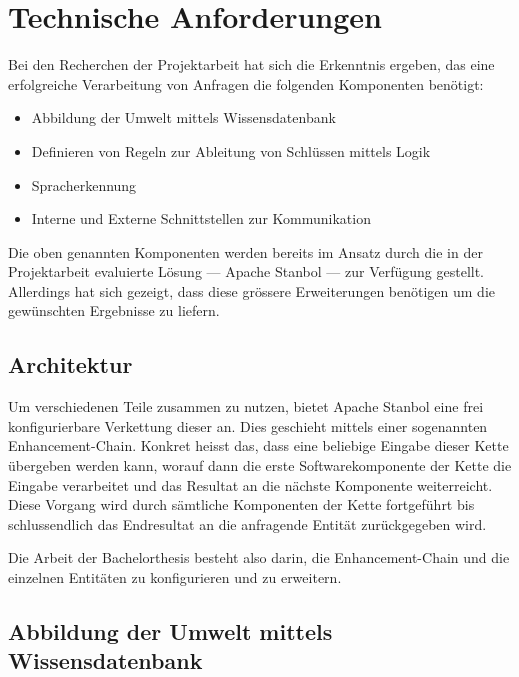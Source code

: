 \chapter{Technische Anforderungen}
\label{chap:technischeAnforderungen}

Bei den Recherchen der Projektarbeit hat sich die Erkenntnis ergeben, das eine erfolgreiche Verarbeitung von Anfragen die folgenden Komponenten benötigt:
\begin{itemize}
	\item Abbildung der Umwelt mittels Wissensdatenbank
	\item Definieren von Regeln zur Ableitung von Schlüssen mittels Logik
	\item Spracherkennung 
	\item Interne und Externe Schnittstellen zur Kommunikation
\end{itemize}

Die oben genannten Komponenten werden bereits im Ansatz durch die in der Projektarbeit evaluierte Lösung --- Apache Stanbol --- zur Verfügung gestellt. Allerdings hat sich gezeigt, dass diese grössere Erweiterungen benötigen um die gewünschten Ergebnisse zu liefern.

\section{Architektur}
\label{sec:architektur}
Um verschiedenen Teile zusammen zu nutzen, bietet Apache Stanbol eine frei konfigurierbare Verkettung dieser an. Dies geschieht mittels einer sogenannten Enhancement-Chain. Konkret heisst das, dass eine beliebige Eingabe dieser Kette übergeben werden kann, worauf dann die erste Softwarekomponente der Kette die Eingabe verarbeitet und das Resultat an die nächste Komponente weiterreicht. Diese Vorgang wird durch sämtliche Komponenten der Kette fortgeführt bis schlussendlich das Endresultat an die  anfragende Entität zurückgegeben wird.

Die Arbeit der Bachelorthesis besteht also darin, die Enhancement-Chain und die einzelnen Entitäten zu konfigurieren und zu erweitern.


\section{Abbildung der Umwelt mittels Wissensdatenbank}
\label{sec:architektur_wissensdatenbank}

